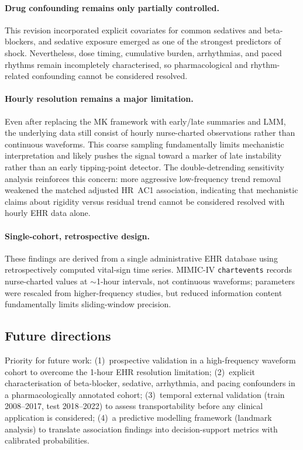 \documentclass[referee,lineno,pdflatex]{sn-article-template/sn-jnl}
\begin{document}
\paragraph{Drug confounding remains only partially controlled.}
This revision incorporated explicit covariates for common sedatives and beta-blockers,
and sedative exposure emerged as one of the strongest predictors of shock.
Nevertheless, dose timing, cumulative burden, arrhythmias, and paced rhythms remain
incompletely characterised, so pharmacological and rhythm-related confounding cannot
be considered resolved.

\paragraph{Hourly resolution remains a major limitation.}
Even after replacing the MK framework with early/late summaries and LMM,
the underlying data still consist of hourly nurse-charted observations rather than
continuous waveforms.
This coarse sampling fundamentally limits mechanistic interpretation and likely pushes
the signal toward a marker of late instability rather than an early tipping-point detector.
The double-detrending sensitivity analysis reinforces this concern: more aggressive
low-frequency trend removal weakened the matched adjusted HR~AC1 association, indicating
that mechanistic claims about rigidity versus residual trend cannot be considered resolved
with hourly EHR data alone.

\paragraph{Single-cohort, retrospective design.}
These findings are derived from a single administrative EHR database
using retrospectively computed vital-sign time series.
MIMIC-IV \texttt{chartevents} records nurse-charted values at $\sim$1-hour intervals,
not continuous waveforms; parameters were rescaled from higher-frequency studies,
but reduced information content fundamentally limits sliding-window precision.

\subsection{Future directions}

Priority for future work:
(1)~prospective validation in a high-frequency waveform cohort to overcome
the 1-hour EHR resolution limitation;
(2)~explicit characterisation of beta-blocker, sedative, arrhythmia, and pacing
confounders in a pharmacologically annotated cohort;
(3)~temporal external validation (train 2008--2017, test 2018--2022) to assess
transportability before any clinical application is considered;
(4)~a predictive modelling framework (landmark analysis) to translate association
findings into decision-support metrics with calibrated probabilities.
\end{document}
